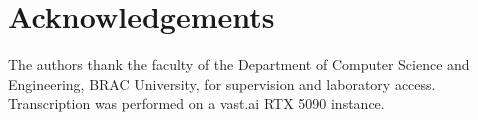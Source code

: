 \documentclass[conference]{IEEEtran}
\begin{document}
\section*{Acknowledgements}
The authors thank the faculty of the Department of Computer Science and
Engineering, BRAC University, for supervision and laboratory access.
Transcription was performed on a vast.ai RTX 5090 instance.



\end{document}
